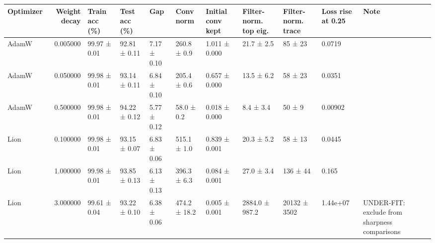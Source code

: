 \begin{tabular}{lrlllllllll}
\toprule
Optimizer & Weight decay & Train acc (\%) & Test acc (\%) & Gap & Conv norm & Initial conv kept & Filter-norm. top eig. & Filter-norm. trace & Loss rise at 0.25 & Note \\
\midrule
AdamW & 0.005000 & 99.97 ± 0.01 & 92.81 ± 0.11 & 7.17 ± 0.10 & 260.8 ± 0.9 & 1.011 ± 0.000 & 21.7 ± 2.5 & 85 ± 23 & 0.0719 &  \\
AdamW & 0.050000 & 99.98 ± 0.01 & 93.14 ± 0.11 & 6.84 ± 0.10 & 205.4 ± 0.6 & 0.657 ± 0.000 & 13.5 ± 6.2 & 58 ± 23 & 0.0351 &  \\
AdamW & 0.500000 & 99.98 ± 0.01 & 94.22 ± 0.12 & 5.77 ± 0.12 & 58.0 ± 0.2 & 0.018 ± 0.000 & 8.4 ± 3.4 & 50 ± 9 & 0.00902 &  \\
Lion & 0.100000 & 99.98 ± 0.01 & 93.15 ± 0.07 & 6.83 ± 0.06 & 515.1 ± 1.0 & 0.839 ± 0.001 & 20.3 ± 5.2 & 58 ± 13 & 0.0445 &  \\
Lion & 1.000000 & 99.98 ± 0.01 & 93.85 ± 0.13 & 6.13 ± 0.13 & 396.3 ± 6.3 & 0.084 ± 0.001 & 27.0 ± 3.4 & 136 ± 44 & 0.165 &  \\
Lion & 3.000000 & 99.61 ± 0.04 & 93.22 ± 0.10 & 6.38 ± 0.06 & 474.2 ± 18.2 & 0.005 ± 0.001 & 2884.0 ± 987.2 & 20132 ± 3502 & 1.44e+07 & UNDER-FIT: exclude from sharpness comparisons \\
\bottomrule
\end{tabular}
